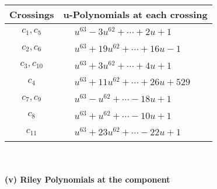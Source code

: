 \documentclass[1p]{elsarticle_modified}
\theoremstyle{definition}
\begin{document}
\begin{tabular}{m{50pt}|m{274pt}}
Crossings & \hspace{64pt}u-Polynomials at each crossing \\
\hline $$\begin{aligned}c_{1},c_{5}\end{aligned}$$&$\begin{aligned}
&u^{63}-3 u^{62}+\cdots+2 u+1
\end{aligned}$\\
\hline $$\begin{aligned}c_{2},c_{6}\end{aligned}$$&$\begin{aligned}
&u^{63}+19 u^{62}+\cdots+16 u-1
\end{aligned}$\\
\hline $$\begin{aligned}c_{3},c_{10}\end{aligned}$$&$\begin{aligned}
&u^{63}+3 u^{62}+\cdots+4 u+1
\end{aligned}$\\
\hline $$\begin{aligned}c_{4}\end{aligned}$$&$\begin{aligned}
&u^{63}+11 u^{62}+\cdots+26 u+529
\end{aligned}$\\
\hline $$\begin{aligned}c_{7},c_{9}\end{aligned}$$&$\begin{aligned}
&u^{63}- u^{62}+\cdots-18 u+1
\end{aligned}$\\
\hline $$\begin{aligned}c_{8}\end{aligned}$$&$\begin{aligned}
&u^{63}+u^{62}+\cdots-10 u+1
\end{aligned}$\\
\hline $$\begin{aligned}c_{11}\end{aligned}$$&$\begin{aligned}
&u^{63}+23 u^{62}+\cdots-22 u+1
\end{aligned}$\\
\hline
\end{tabular}\\~\\
\newpage\renewcommand{\arraystretch}{1}
\flushleft \textbf{(v) Riley Polynomials at the component}\newline \\
\end{document}
